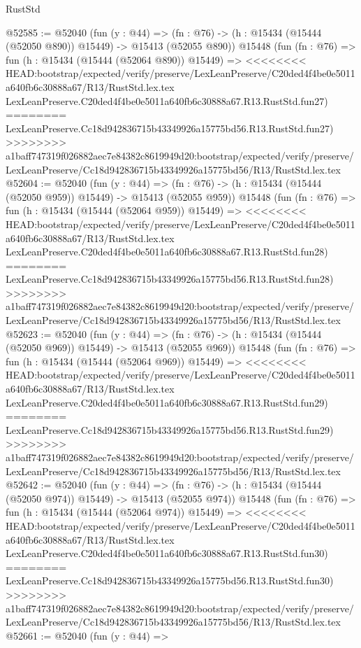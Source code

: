 \begin{lexlean}{RustStd}
\begin{coremodule}
{\begin{coremodule}
{{{{{{{{{{{{{{{{{{{{{{{{{{{{{{{{{{{{{{{{{{{{{{{{{{{{{{{{{{{{@52585 := @52040
    (fun (y : @44) =>
    (fn : @76) -> (h : @15434 (@15444 (@52050 @890)) @15449) -> @15413 (@52055 @890))
    @15448
    (fun (fn : @76) =>
    fun (h : @15434 (@15444 (@52064 @890)) @15449) =>
<<<<<<<< HEAD:bootstrap/expected/verify/preserve/LexLeanPreserve/C20ded4f4be0e5011a640fb6c30888a67/R13/RustStd.lex.tex
    LexLeanPreserve.C20ded4f4be0e5011a640fb6c30888a67.R13.RustStd.fun27)
========
    LexLeanPreserve.Cc18d942836715b43349926a15775bd56.R13.RustStd.fun27)
>>>>>>>> a1baff747319f026882aec7e84382c8619949d20:bootstrap/expected/verify/preserve/LexLeanPreserve/Cc18d942836715b43349926a15775bd56/R13/RustStd.lex.tex
@52604 := @52040
    (fun (y : @44) =>
    (fn : @76) -> (h : @15434 (@15444 (@52050 @959)) @15449) -> @15413 (@52055 @959))
    @15448
    (fun (fn : @76) =>
    fun (h : @15434 (@15444 (@52064 @959)) @15449) =>
<<<<<<<< HEAD:bootstrap/expected/verify/preserve/LexLeanPreserve/C20ded4f4be0e5011a640fb6c30888a67/R13/RustStd.lex.tex
    LexLeanPreserve.C20ded4f4be0e5011a640fb6c30888a67.R13.RustStd.fun28)
========
    LexLeanPreserve.Cc18d942836715b43349926a15775bd56.R13.RustStd.fun28)
>>>>>>>> a1baff747319f026882aec7e84382c8619949d20:bootstrap/expected/verify/preserve/LexLeanPreserve/Cc18d942836715b43349926a15775bd56/R13/RustStd.lex.tex
@52623 := @52040
    (fun (y : @44) =>
    (fn : @76) -> (h : @15434 (@15444 (@52050 @969)) @15449) -> @15413 (@52055 @969))
    @15448
    (fun (fn : @76) =>
    fun (h : @15434 (@15444 (@52064 @969)) @15449) =>
<<<<<<<< HEAD:bootstrap/expected/verify/preserve/LexLeanPreserve/C20ded4f4be0e5011a640fb6c30888a67/R13/RustStd.lex.tex
    LexLeanPreserve.C20ded4f4be0e5011a640fb6c30888a67.R13.RustStd.fun29)
========
    LexLeanPreserve.Cc18d942836715b43349926a15775bd56.R13.RustStd.fun29)
>>>>>>>> a1baff747319f026882aec7e84382c8619949d20:bootstrap/expected/verify/preserve/LexLeanPreserve/Cc18d942836715b43349926a15775bd56/R13/RustStd.lex.tex
@52642 := @52040
    (fun (y : @44) =>
    (fn : @76) -> (h : @15434 (@15444 (@52050 @974)) @15449) -> @15413 (@52055 @974))
    @15448
    (fun (fn : @76) =>
    fun (h : @15434 (@15444 (@52064 @974)) @15449) =>
<<<<<<<< HEAD:bootstrap/expected/verify/preserve/LexLeanPreserve/C20ded4f4be0e5011a640fb6c30888a67/R13/RustStd.lex.tex
    LexLeanPreserve.C20ded4f4be0e5011a640fb6c30888a67.R13.RustStd.fun30)
========
    LexLeanPreserve.Cc18d942836715b43349926a15775bd56.R13.RustStd.fun30)
>>>>>>>> a1baff747319f026882aec7e84382c8619949d20:bootstrap/expected/verify/preserve/LexLeanPreserve/Cc18d942836715b43349926a15775bd56/R13/RustStd.lex.tex
@52661 := @52040
    (fun (y : @44) =>
}}}}}}}}}}}}}}}}}}}}}}}}}}}}}}}}}}}}}}}}}}}}}}}}}}}}}}}}}}}}
\end{coremodule}}
\end{coremodule}
\end{lexlean}
